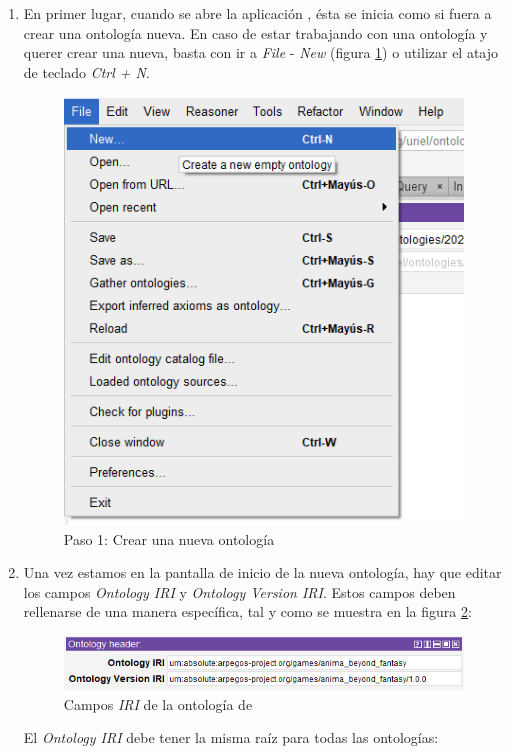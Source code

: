 \begin{enumerate}
    
    \item En primer lugar, cuando se abre la aplicación \protege, ésta se inicia como si fuera a crear una ontología nueva. En 
    caso de estar trabajando con una ontología y querer crear una nueva, basta con ir a \textit{File} - \textit{New} (figura \ref*{Create_new_ontology}) o utilizar 
    el atajo de teclado \textit{Ctrl + N}.\newpage

    \begin{figure}[H]
        \centering
        \includegraphics[scale=0.6]{Figures/Protege/Create_Ontology.png}
        \caption{Paso 1: Crear una nueva ontología}
        \label{Create_new_ontology}
    \end{figure}

    \item Una vez estamos en la pantalla de inicio de la nueva ontología, hay que editar los campos \textit{Ontology IRI} y 
    \textit{Ontology Version IRI}. Estos campos deben rellenarse de una manera específica, tal y como se muestra en la 
    figura \ref*{IRI_demo}:

    \begin{figure}[ht]
        \centering
        \includegraphics[scale=0.6]{Figures/Protege/IRI_demo.png}
        \caption{Campos \textit{IRI} de la ontología de \anima}
        \label{IRI_demo}
    \end{figure}
    El \textit{Ontology IRI} debe tener la misma raíz para todas las ontologías:


\end{enumerate}
